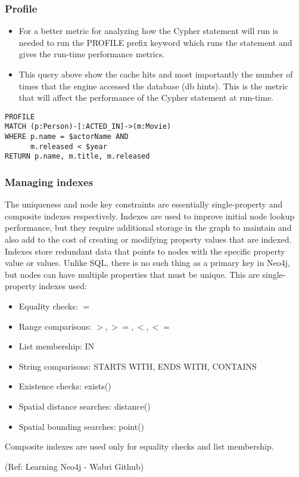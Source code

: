 \begin{frame}[fragile]\frametitle{Profile}

\begin{itemize}
\item For a better metric for analyzing how the Cypher statement will run is needed to run the PROFILE prefix keyword which runs the statement and gives the run-time performance metrics.
\item This query above show the cache hits and most importantly the number of times that the engine accessed the database (db hints). This is the metric that will affect the performance of the Cypher statement at run-time.
\end{itemize}

\begin{lstlisting}
PROFILE
MATCH (p:Person)-[:ACTED_IN]->(m:Movie)
WHERE p.name = $actorName AND
      m.released < $year
RETURN p.name, m.title, m.released
\end{lstlisting}



\end{frame}


\begin{frame}[fragile]\frametitle{Managing indexes}
The uniqueness and node key constraints are essentially single-property and composite indexes respectively. Indexes are used to improve initial node lookup performance, but they require additional storage in the graph to maintain and also add to the cost of creating or modifying property values that are indexed. Indexes store redundant data that points to nodes with the specific property value or values. Unlike SQL, there is no such thing as a primary key in Neo4j, but nodes can have multiple properties that must be unique. This are single-property indexes used:



\begin{itemize}
\item Equality checks: $=$
\item Range comparisons: $>,>=,<, <=$
\item List membership: IN
\item String comparisons: STARTS WITH, ENDS WITH, CONTAINS
\item Existence checks: exists()
\item Spatial distance searches: distance()
\item Spatial bounding searches: point()
\end{itemize}

Composite indexes are used only for equality checks and list membership.



{\tiny (Ref: Learning Neo4j - Wabri Github)}

\end{frame}


